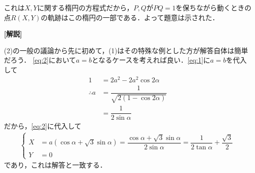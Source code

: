 \documentclass[../../main.tex]{subfiles}
\begin{document}
これは$X,Y$に関する楕円の方程式だから，$P,Q$が$PQ=1$を保ちながら動くときの点$R(X,Y)$の軌跡はこの楕円の一部である．よって題意は示された．

{\bf [解説]}

(2)の一般の議論から先に初めて，(1)はその特殊な例とした方が解答自体は簡単だろう．
\cref{eq:2}において$a=b$となるケースを考えれば良い．\cref{eq:1}に$a=b$を代入して
\begin{align}
  1 &= 2a^2 -2a^2\cos2\alpha \\
  \therefore
  a &= \dfrac{1}{\sqrt{2(1-\cos2\alpha)}} \\
  &= \dfrac{1}{2\sin\alpha}
\end{align}
だから，\cref{eq:2}に代入して
\begin{align}
  \begin{cases}
    X &= a(\cos\alpha+\sqrt{3}\sin\alpha) = \dfrac{\cos\alpha+\sqrt{3}\sin\alpha}{2\sin\alpha} = \dfrac{1}{2\tan\alpha} + \dfrac{\sqrt{3}}{2} \\
    Y &= 0
  \end{cases}
\end{align}
であり，これは解答と一致する．
\end{document}
